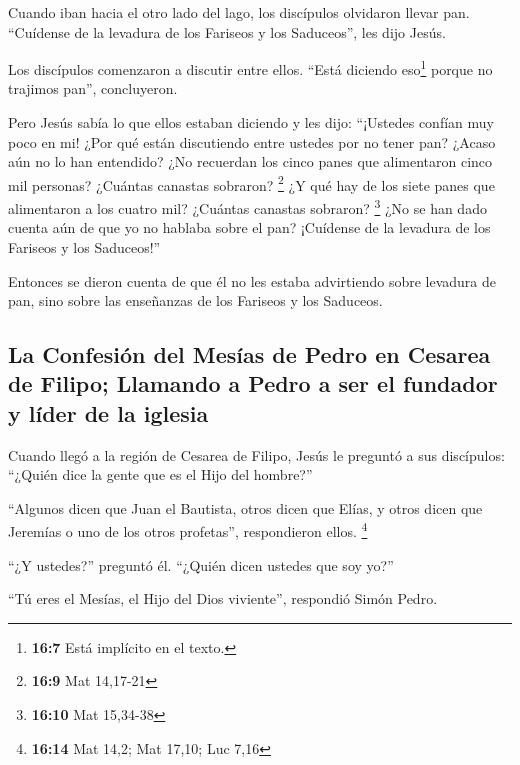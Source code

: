  Cuando iban hacia el otro lado del lago, los discípulos
olvidaron llevar pan.  ``Cuídense de la levadura de los
Fariseos y los Saduceos'', les dijo Jesús.

 Los discípulos comenzaron a discutir entre ellos. ``Está
diciendo eso\footnote{\textbf{16:7} Está implícito en el texto.} porque
no trajimos pan'', concluyeron.

 Pero Jesús sabía lo que ellos estaban diciendo y les
dijo: ``¡Ustedes confían muy poco en mi! ¿Por qué están discutiendo
entre ustedes por no tener pan?  ¿Acaso aún no lo han
entendido? ¿No recuerdan los cinco panes que alimentaron cinco mil
personas? ¿Cuántas canastas sobraron? \footnote{\textbf{16:9} Mat
  14,17-21}  ¿Y qué hay de los siete panes que
alimentaron a los cuatro mil? ¿Cuántas canastas sobraron? \footnote{\textbf{16:10}
  Mat 15,34-38}  ¿No se han dado cuenta aún de que yo no
hablaba sobre el pan? ¡Cuídense de la levadura de los Fariseos y los
Saduceos!''

 Entonces se dieron cuenta de que él no les estaba
advirtiendo sobre levadura de pan, sino sobre las enseñanzas de los
Fariseos y los Saduceos.

\hypertarget{la-confesiuxf3n-del-mesuxedas-de-pedro-en-cesarea-de-filipo-llamando-a-pedro-a-ser-el-fundador-y-luxedder-de-la-iglesia}{%
\subsection{La Confesión del Mesías de Pedro en Cesarea de Filipo;
Llamando a Pedro a ser el fundador y líder de la
iglesia}\label{la-confesiuxf3n-del-mesuxedas-de-pedro-en-cesarea-de-filipo-llamando-a-pedro-a-ser-el-fundador-y-luxedder-de-la-iglesia}}

 Cuando llegó a la región de Cesarea de Filipo, Jesús le
preguntó a sus discípulos: ``¿Quién dice la gente que es el Hijo del
hombre?''

 ``Algunos dicen que Juan el Bautista, otros dicen que
Elías, y otros dicen que Jeremías o uno de los otros profetas'',
respondieron ellos. \footnote{\textbf{16:14} Mat 14,2; Mat 17,10; Luc
  7,16}

 ``¿Y ustedes?'' preguntó él. ``¿Quién dicen ustedes que
soy yo?''

 ``Tú eres el Mesías, el Hijo del Dios viviente'',
respondió Simón Pedro.


